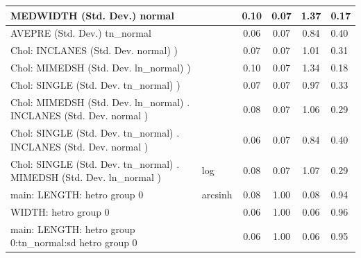 \begin{table}
\begin{center}
\begin{tabular}{|l|l|c|c|c|l|}
			\hline
			MEDWIDTH (Std. Dev.) normal &  & 0.10 & 0.07 & 1.37 & 0.17 \\
			\hline
			AVEPRE (Std. Dev.) tn_normal &  & 0.06 & 0.07 & 0.84 & 0.40 \\
			\hline
			 Chol: INCLANES (Std. Dev. normal) ) &  & 0.07 & 0.07 & 1.01 & 0.31 \\
			\hline
			 Chol: MIMEDSH (Std. Dev. ln_normal) ) &  & 0.10 & 0.07 & 1.34 & 0.18 \\
			\hline
			 Chol: SINGLE (Std. Dev. tn_normal) ) &  & 0.07 & 0.07 & 0.97 & 0.33 \\
			\hline
			 Chol: MIMEDSH (Std. Dev. ln_normal) . INCLANES (Std. Dev.   normal ) &  & 0.08 & 0.07 & 1.06 & 0.29 \\
			\hline
			 Chol: SINGLE (Std. Dev. tn_normal) . INCLANES (Std. Dev.   normal ) &  & 0.06 & 0.07 & 0.84 & 0.40 \\
			\hline
			 Chol: SINGLE (Std. Dev. tn_normal) . MIMEDSH (Std. Dev.   ln_normal ) & log & 0.08 & 0.07 & 1.07 & 0.29 \\
			\hline
			main: LENGTH: hetro group 0 & arcsinh & 0.08 & 1.00 & 0.08 & 0.94 \\
			\hline
			WIDTH: hetro group 0 &  & 0.06 & 1.00 & 0.06 & 0.96 \\
			\hline
			main: LENGTH: hetro group 0:tn_normal:sd  hetro group 0 &  & 0.06 & 1.00 & 0.06 & 0.95 \\
			\hline
		\end{tabular}
	\end{center}
\end{table}